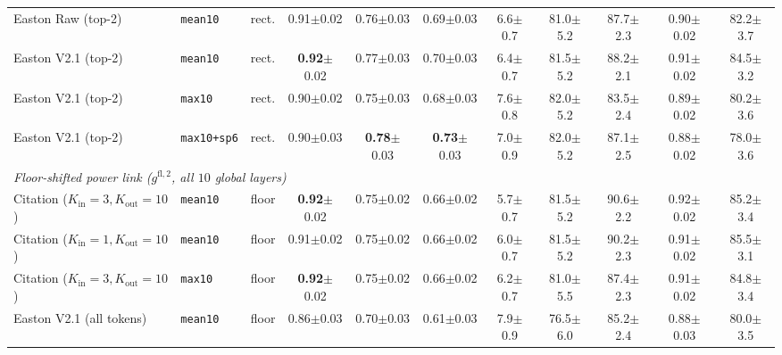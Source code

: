 \begin{table}[t]
{\begin{tabular}{lllcccccccc}
Easton Raw (top-2) & \texttt{mean10} & rect. & 0.91{\scriptsize$\pm$0.02} & 0.76{\scriptsize$\pm$0.03} & 0.69{\scriptsize$\pm$0.03} & 6.6{\scriptsize$\pm$0.7} & 81.0{\scriptsize$\pm$5.2} & 87.7{\scriptsize$\pm$2.3} & 0.90{\scriptsize$\pm$0.02} & 82.2{\scriptsize$\pm$3.7} \\
Easton V2.1 (top-2) & \texttt{mean10} & rect. & \textbf{0.92}{\scriptsize$\pm$0.02} & 0.77{\scriptsize$\pm$0.03} & 0.70{\scriptsize$\pm$0.03} & 6.4{\scriptsize$\pm$0.7} & 81.5{\scriptsize$\pm$5.2} & 88.2{\scriptsize$\pm$2.1} & 0.91{\scriptsize$\pm$0.02} & 84.5{\scriptsize$\pm$3.2} \\
Easton V2.1 (top-2) & \texttt{max10} & rect. & 0.90{\scriptsize$\pm$0.02} & 0.75{\scriptsize$\pm$0.03} & 0.68{\scriptsize$\pm$0.03} & 7.6{\scriptsize$\pm$0.8} & 82.0{\scriptsize$\pm$5.2} & 83.5{\scriptsize$\pm$2.4} & 0.89{\scriptsize$\pm$0.02} & 80.2{\scriptsize$\pm$3.6} \\
Easton V2.1 (top-2) & \texttt{max10+sp6} & rect. & 0.90{\scriptsize$\pm$0.03} & \textbf{0.78}{\scriptsize$\pm$0.03} & \textbf{0.73}{\scriptsize$\pm$0.03} & 7.0{\scriptsize$\pm$0.9} & 82.0{\scriptsize$\pm$5.2} & 87.1{\scriptsize$\pm$2.5} & 0.88{\scriptsize$\pm$0.02} & 78.0{\scriptsize$\pm$3.6} \\
\midrule
\multicolumn{11}{l}{\emph{Floor-shifted power link ($g^{\mathrm{fl},2}$, all $10$ global layers)}} \\
Citation ($K_{\mathrm{in}}{=}3, K_{\mathrm{out}}{=}10$) & \texttt{mean10} & floor & \textbf{0.92}{\scriptsize$\pm$0.02} & 0.75{\scriptsize$\pm$0.02} & 0.66{\scriptsize$\pm$0.02} & 5.7{\scriptsize$\pm$0.7} & 81.5{\scriptsize$\pm$5.2} & 90.6{\scriptsize$\pm$2.2} & 0.92{\scriptsize$\pm$0.02} & 85.2{\scriptsize$\pm$3.4} \\
Citation ($K_{\mathrm{in}}{=}1, K_{\mathrm{out}}{=}10$) & \texttt{mean10} & floor & 0.91{\scriptsize$\pm$0.02} & 0.75{\scriptsize$\pm$0.02} & 0.66{\scriptsize$\pm$0.02} & 6.0{\scriptsize$\pm$0.7} & 81.5{\scriptsize$\pm$5.2} & 90.2{\scriptsize$\pm$2.3} & 0.91{\scriptsize$\pm$0.02} & 85.5{\scriptsize$\pm$3.1} \\
Citation ($K_{\mathrm{in}}{=}3, K_{\mathrm{out}}{=}10$) & \texttt{max10} & floor & \textbf{0.92}{\scriptsize$\pm$0.02} & 0.75{\scriptsize$\pm$0.02} & 0.66{\scriptsize$\pm$0.02} & 6.2{\scriptsize$\pm$0.7} & 81.0{\scriptsize$\pm$5.5} & 87.4{\scriptsize$\pm$2.3} & 0.91{\scriptsize$\pm$0.02} & 84.8{\scriptsize$\pm$3.4} \\
Easton V2.1 (all tokens) & \texttt{mean10} & floor & 0.86{\scriptsize$\pm$0.03} & 0.70{\scriptsize$\pm$0.03} & 0.61{\scriptsize$\pm$0.03} & 7.9{\scriptsize$\pm$0.9} & 76.5{\scriptsize$\pm$6.0} & 85.2{\scriptsize$\pm$2.4} & 0.88{\scriptsize$\pm$0.03} & 80.0{\scriptsize$\pm$3.5} \\

\end{tabular}}
\end{table}
